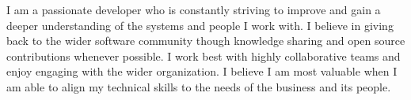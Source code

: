 %
%
%
\par{
I am a passionate developer who is constantly striving to improve and gain a deeper understanding of the
systems and people I work with. I believe in giving back to the wider software community though knowledge sharing and open source contributions whenever possible. I work best with highly collaborative teams and enjoy engaging with the wider organization. I believe I am most valuable when I am able to align my technical skills to the needs of the business and its people.
}